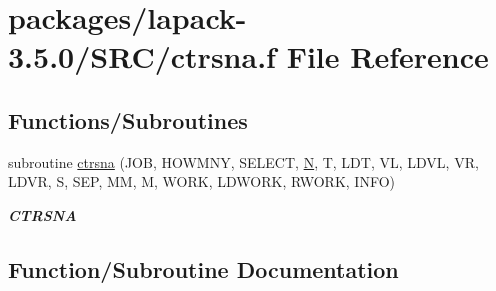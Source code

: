 \hypertarget{ctrsna_8f}{}\section{packages/lapack-\/3.5.0/\+S\+R\+C/ctrsna.f File Reference}
\label{ctrsna_8f}
\subsection*{Functions/\+Subroutines}
\begin{DoxyCompactItemize}
\item 
subroutine \hyperlink{ctrsna_8f_a79eec413680c2c3aa25868302de2c004}{ctrsna} (J\+O\+B, H\+O\+W\+M\+N\+Y, S\+E\+L\+E\+C\+T, \hyperlink{polmisc_8c_a0240ac851181b84ac374872dc5434ee4}{N}, T, L\+D\+T, V\+L, L\+D\+V\+L, V\+R, L\+D\+V\+R, S, S\+E\+P, M\+M, M, W\+O\+R\+K, L\+D\+W\+O\+R\+K, R\+W\+O\+R\+K, I\+N\+F\+O)
\begin{DoxyCompactList}\small\item\em {\bfseries C\+T\+R\+S\+N\+A} \end{DoxyCompactList}\end{DoxyCompactItemize}


\subsection{Function/\+Subroutine Documentation}
\hypertarget{ctrsna_8f_a79eec413680c2c3aa25868302de2c004}{}
